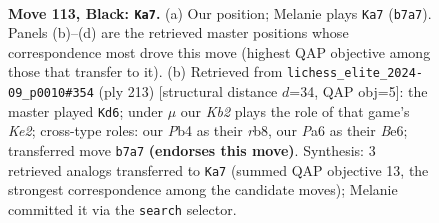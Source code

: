 \documentclass[11pt]{article}
\begin{document}
\begin{figure}[p]\centering
\begin{subfigure}{0.46\textwidth}\centering
\resizebox{\linewidth}{!}{%
\newchessgame
\chessboard[
  setfen={8/1k6/p5r1/P1p2p1p/1p3P1P/1P2PKP1/7R/8 b - - 14 113},
  showmover=false,
  pgfstyle=straightmove, color=movearrow, markmove={b7-a7}
]}
\caption{}
\end{subfigure}\hfill
\begin{subfigure}{0.46\textwidth}\centering
\resizebox{\linewidth}{!}{%
\newchessgame
\chessboard[
  setfen={1R6/4k3/4b1p1/2p4p/p1r4P/P1B2PK1/1P4P1/8 b - - 35 107},
  showmover=false,
  pgfstyle=straightmove, color=movearrow, markmove={e7-d6}
]}
\caption{}
\end{subfigure}
\\[4pt]

\caption{\textbf{Move 113, Black: \texttt{Ka7}.} (a) Our position; Melanie plays \texttt{Ka7} (\texttt{b7a7}). Panels (b)--(d) are the retrieved master positions whose correspondence most drove this move (highest QAP objective among those that transfer to it). (b) Retrieved from \texttt{lichess\_elite\_2024-09\_p0010\#354} (ply 213) [structural distance $d$=34, QAP obj=5]: the master played \texttt{Kd6}; under $\mu$ our \emph{Kb2} plays the role of that game's \emph{Ke2}; cross-type roles: our \emph{P}b4 as their \emph{r}b8, our \emph{P}a6 as their \emph{B}e6; transferred move \texttt{b7a7} \textbf{(endorses this move)}. Synthesis: 3 retrieved analogs transferred to \texttt{Ka7} (summed QAP objective 13, the strongest correspondence among the candidate moves); Melanie committed it via the \texttt{search} selector.}
\label{fig:thought-m225}
\end{figure}

\clearpage
\end{document}
